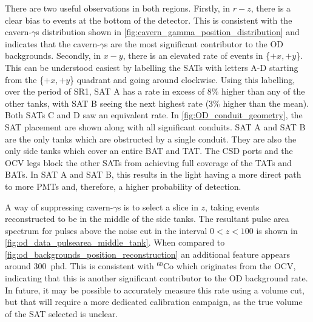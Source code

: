 

\par
There are two useful observations in both regions.
Firstly, in $r-z$, there is a clear bias to events at the bottom of the detector.
This is consistent with the cavern-$\gamma$s distribution shown in \autoref{fig:cavern_gamma_position_distribution} and indicates that the cavern-$\gamma$s are the most significant contributor to the OD backgrounds.
Secondly, in $x-y$, there is an elevated rate of events in \{$+x,+y$\}.
This can be understood easiest by labelling the SATs with letters A-D starting from the \{$+x,+y$\} quadrant and going around clockwise.
Using this labelling, over the period of SR1, SAT A has a rate in excess of 8\% higher than any of the other tanks, with SAT B seeing the next highest rate (3\% higher than the mean).
Both SATs C and D saw an equivalent rate.
In \autoref{fig:OD_conduit_geometry}, the SAT placement are shown along with all significant conduits.
SAT A and SAT B are the only tanks which are obstructed by a single conduit.
They are also the only side tanks which cover an entire BAT and TAT.
The CSD ports and the OCV legs block the other SATs from achieving full coverage of the TATs and BATs.
In SAT A and SAT B, this results in the light having a more direct path to more PMTs and, therefore, a higher probability of detection.
\par
A way of suppressing cavern-$\gamma$s is to select a slice in $z$, taking events reconstructed to be in the middle of the side tanks.
The resultant pulse area spectrum for pulses above the noise cut in the interval $0<z<100$ is shown in \autoref{fig:od_data_pulsearea_middle_tank}.
When compared to \autoref{fig:od_backgrounds_position_reconstruction} an additional feature appears around 300~phd.
This is consistent with ${}^{60}$Co which originates from the OCV, indicating that this is another significant contributor to the OD background rate.
In future, it may be possible to accurately measure this rate using a volume cut, but that will require a more dedicated calibration campaign, as the true volume of the SAT selected is unclear.

